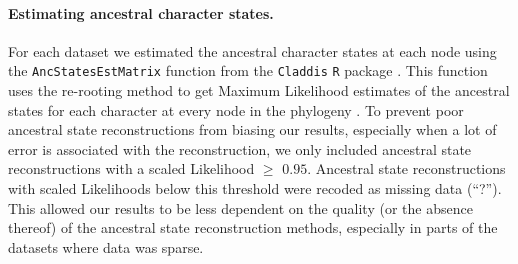 \documentclass[12pt,a4paper]{article}
\begin{document}
\paragraph{Estimating ancestral character states.}
\label{ace}
For each dataset we estimated the ancestral character states at each node using the \texttt{AncStatesEstMatrix} function from the \texttt{Claddis} \texttt{R} package \citep{Claddis,R}.
This function uses the re-rooting method \citep{Yang01121995,Garland2000} to get Maximum Likelihood estimates of the ancestral states for each character at every node in the phylogeny \citep[based on the \texttt{rerootingMethod} function in \texttt{phytools};][]{phytools}.
To prevent poor ancestral state reconstructions from biasing our results, especially when a lot of error is associated with the reconstruction, we only included ancestral state reconstructions with a scaled Likelihood $\geq$ $0.95$.
Ancestral state reconstructions with scaled Likelihoods below this threshold were recoded as missing data (``?'').
This allowed our results to be less dependent on the quality (or the absence thereof) of the ancestral state reconstruction methods, especially in parts of the datasets where data was sparse.
 
\end{document}
